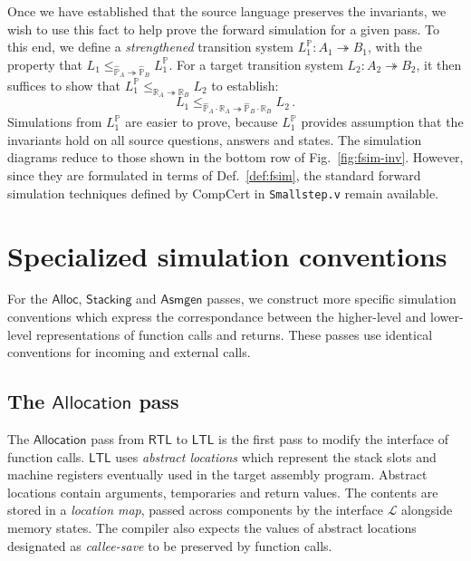 \documentclass[draft,11pt]{report}
\newcommand{\kw}[1]{\ensuremath{ \mathsf{#1} }}
\begin{document}
Once we have established that
the source language preserves the invariants,
we wish to use this fact to help prove the forward simulation
for a given pass.
To this end,
we define a \emph{strengthened} transition system
$L_1^\mathbb{P} : A_1 \twoheadrightarrow B_1$,
with the property that
$
   L_1 \le_{\hat{\mathbb{P}}_A \twoheadrightarrow \hat{\mathbb{P}}_B}
   L_1^\mathbb{P}
$.
For a target transition system $L_2 : A_2 \twoheadrightarrow B_2$,
it then suffices to show that
$
  L_1^\mathbb{P}
  \le_{\mathbb{R}_A \twoheadrightarrow \mathbb{R}_B}
  L_2
$
to establish:
\[
  L_1
  \le_{\hat{\mathbb{P}}_A \cdot \mathbb{R}_A \twoheadrightarrow
       \hat{\mathbb{P}}_B \cdot \mathbb{R}_B}
  L_2 \,.
\]
Simulations from $L_1^\mathbb{P}$
are easier to prove,
because $L_1^\mathbb{P}$
provides assumption that the invariants hold
on all source questions, answers and states.
The simulation diagrams
reduce to those shown in the bottom row of
Fig.~\ref{fig:fsim-inv}.
However, since they are formulated in terms of
Def.~\ref{def:fsim},
the standard forward simulation techniques
defined by CompCert
in \texttt{Smallstep.v}
remain available.



\chapter{Specialized simulation conventions} \label{sec:backend} %

For the \kw{Alloc}, \kw{Stacking} and \kw{Asmgen} passes,
we construct more specific simulation conventions
which express the correspondance between
the higher-level and lower-level representations
of function calls and returns.
These passes use identical conventions for
incoming and external calls.

\section{The \kw{Allocation} pass} \label{sec:alloc} %

The \kw{Allocation} pass from \kw{RTL} to \kw{LTL}
is the first pass to modify the interface of function calls.
\kw{LTL} uses \emph{abstract locations}
which represent the stack slots and machine registers
eventually used in the target assembly program.
Abstract locations contain arguments, temporaries and return values.
The contents are stored in a \emph{location map},
passed across components by the interface $\mathcal{L}$
alongside memory states.
The compiler also expects the values of
abstract locations designated as \emph{callee-save}
to be preserved by function calls.
\end{document}
